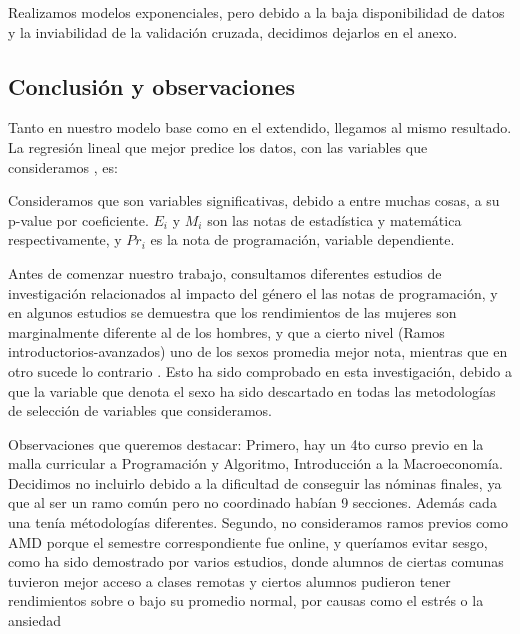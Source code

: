 \documentclass[11pt]{article}
\begin{document}
Realizamos modelos exponenciales, pero debido a la baja disponibilidad de datos y la inviabilidad de la validación cruzada, decidimos dejarlos en el anexo.

\subsection{Conclusión y observaciones}

Tanto en nuestro modelo base como en el extendido, llegamos al mismo resultado. La regresión lineal que mejor predice los datos, con las variables que consideramos , es:

\begin{center}


\end{center}

Consideramos que son variables significativas, debido a entre muchas cosas, a su p-value por coeficiente.  \(E_i\) y  \(M_i\) son las notas de estadística y matemática respectivamente, y  \(Pr_i\) es la nota de programación, variable dependiente.

 
Antes de comenzar nuestro trabajo, consultamos diferentes estudios de investigación relacionados al impacto del género el las notas de programación, y en algunos estudios se demuestra que los rendimientos de las mujeres son marginalmente diferente al de los hombres, y que a cierto nivel (Ramos introductorios-avanzados) uno de los sexos promedia mejor nota, mientras que en otro sucede lo contrario . Esto ha sido comprobado en esta investigación, debido a que la variable que denota el sexo ha sido descartado en todas las metodologías de selección de variables que consideramos.

Observaciones que queremos destacar: Primero, hay un 4to curso previo en la malla curricular a Programación y Algoritmo, Introducción a la Macroeconomía. Decidimos no incluirlo debido a la dificultad de conseguir las nóminas finales, ya que al ser un ramo común pero no coordinado habían 9 secciones. Además cada una tenía métodologías diferentes. Segundo, no consideramos ramos previos como AMD porque el semestre correspondiente fue online, y queríamos evitar sesgo, como ha sido demostrado por varios estudios, donde alumnos de ciertas comunas tuvieron mejor acceso a clases remotas  y ciertos alumnos pudieron tener rendimientos sobre o bajo su promedio normal, por causas como el estrés o la ansiedad 
\end{document}
